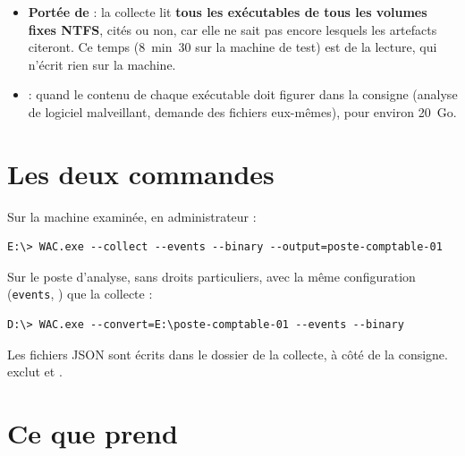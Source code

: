 \documentclass[11pt,a4paper,oneside]{report}
\begin{document}
\begin{itemize}
  \item \textbf{Portée de } : la collecte lit \textbf{tous les
        exécutables de tous les volumes fixes NTFS}, cités ou non, car elle ne
        sait pas encore lesquels les artefacts citeront. Ce temps (8~min~30 sur
        la machine de test) est de la lecture, qui n'écrit rien sur la machine.
  \item \textbf{} : quand le contenu de chaque exécutable doit
        figurer dans la consigne (analyse de logiciel malveillant, demande des
        fichiers eux-mêmes), pour environ 20~Go.
\end{itemize}

\section{Les deux commandes}

Sur la machine examinée, en administrateur :
\begin{lstlisting}
E:\> WAC.exe --collect --events --binary --output=poste-comptable-01
\end{lstlisting}

Sur le poste d'analyse, sans droits particuliers, avec la même configuration
(\texttt{events}, ) que la collecte :
\begin{lstlisting}
D:\> WAC.exe --convert=E:\poste-comptable-01 --events --binary
\end{lstlisting}

Les fichiers JSON sont écrits dans le dossier de la collecte, à côté de la
consigne.  exclut  et .

\section{Ce que prend }
\end{document}
